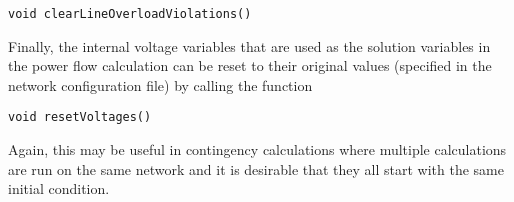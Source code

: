 {
\color{red}
\begin{Verbatim}[fontseries=b]
void clearLineOverloadViolations()
\end{Verbatim}
}

Finally, the internal voltage variables that are used as the solution variables in the power flow calculation can be reset to their original values (specified in the network configuration file) by calling the function

{
\color{red}
\begin{Verbatim}[fontseries=b]
void resetVoltages()
\end{Verbatim}
}

Again, this may be useful in contingency calculations where multiple calculations are run on the same network and it is desirable that they all start with the same initial condition.
